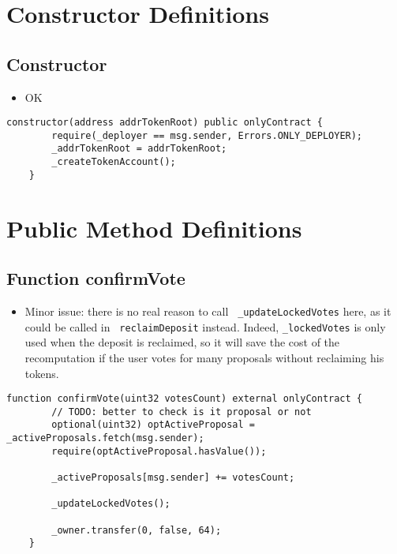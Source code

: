 \section{Constructor Definitions}


\subsection{Constructor}

\begin{itemize}
\item OK
\end{itemize}

\begin{lstlisting}[firstnumber=46]
    constructor(address addrTokenRoot) public onlyContract {
        require(_deployer == msg.sender, Errors.ONLY_DEPLOYER);
        _addrTokenRoot = addrTokenRoot;
        _createTokenAccount();
    }
\end{lstlisting}

\section{Public Method Definitions}


\subsection{Function confirmVote}

\begin{itemize}
\item Minor issue: there is no real reason to call {\tt
  \_updateLockedVotes} here, as it could be called in {\tt
  reclaimDeposit} instead. Indeed, {\tt \_lockedVotes} is only used
  when the deposit is reclaimed, so it will save the cost of the
  recomputation if the user votes for many proposals without
  reclaiming his tokens.
\end{itemize}

\begin{lstlisting}[firstnumber=74]
    function confirmVote(uint32 votesCount) external onlyContract {
        // TODO: better to check is it proposal or not
        optional(uint32) optActiveProposal = _activeProposals.fetch(msg.sender);
        require(optActiveProposal.hasValue());

        _activeProposals[msg.sender] += votesCount;
        
        _updateLockedVotes();

        _owner.transfer(0, false, 64);
    }
\end{lstlisting}

